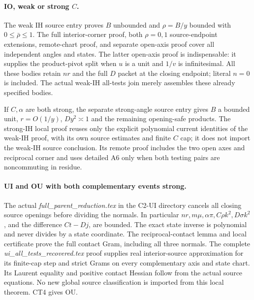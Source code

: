 \paragraph{IO, weak or strong \(C\).}
The weak IH source entry proves \(B\) unbounded and
\(\rho=B/y\) bounded with \(0\leq\bar\rho\leq1\).
The full interior-corner proof, both \(\rho=0,1\) source-endpoint
extensions, remote-chart proof, and separate open-axis proof
cover all independent angles and states.  The latter open-axis
proof is indispensable: it supplies the product-pivot split
when \(u\) is a unit and \(1/v\) is infinitesimal.
All these bodies retain \(nr\) and the full \(D\) packet at the
closing endpoint; literal \(n=0\) is included.
The actual weak-IH all-tests join merely assembles these
already specified bodies.

If \(C,\alpha\) are both strong, the separate strong-angle
source entry gives \(B\) a bounded unit, \(r=O(1/y)\),
\(Dy^2\asymp1\) and the remaining opening-safe products.
The strong-IH local proof reuses only the explicit polynomial
current identities of the weak-IH proof, with its own source
estimates and finite \(C\) cap; it does not import the weak-IH
source conclusion.  Its remote proof includes the two open
axes and reciprocal corner and uses detailed A6 only when
both testing pairs are noncommuting in residue.

\paragraph{UI and OU with both complementary events strong.}
The actual \emph{full\_parent\_reduction.tex} in the C2-UI
directory cancels all closing source openings before dividing
the normals.  In particular \(nr,m\mu,\alpha\pi,C\rho k^2,
D\sigma k^2\), and the difference \(Ct-Dj\), are bounded.
The exact state inverse is polynomial and never divides by
a state coordinate.  The reciprocal-contact lemma and local
certificate prove the full contact Gram, including all three
normals.  The complete \emph{ui\_all\_tests\_recovered.tex}
proof supplies real interior-source approximation for its
finite-cap step and strict Grams on every complementary
axis and state chart.  Its Laurent equality and positive
contact Hessian follow from the actual source equations.
No new global source classification is imported from this
local theorem.  CT4 gives OU.

